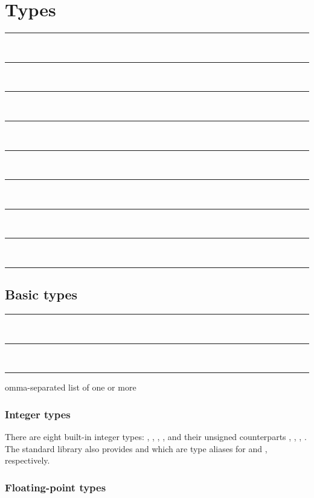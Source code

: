 
\chapter{Types}

\begin{grammar}
\rule{type} \\
\rule{type} \\
\rule{type} \\
\rule{type} \\
\rule{type} \\
\rule{type} \\
\rule{type}  \\
\rule{type}  \\
\rule{type}  
\end{grammar}

\section{Basic types}

\begin{grammar}
\rule{basic-type} \\
\rule{basic-type}  \code{<}  \code{>}\\
\rule{generic-argument-list} comma-separated list of one or more 
\end{grammar}

\subsection{Integer types}

There are eight built-in integer types: , , ,
, and their unsigned counterparts , ,
, . The standard library also provides  and
 which are type aliases for  and ,
respectively.

\subsection{Floating-point types}

